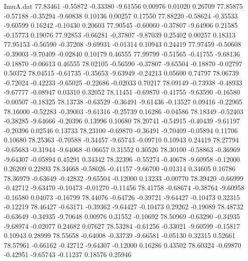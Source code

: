 \begin{filecontents}{ImuA.dat}
  77.83461   -0.55872   -0.33380   -9.61556    0.00976    0.01020    0.26709
  77.85875   -0.57188   -0.35294   -9.60838    0.10136    0.00257    0.17550
  77.88220   -0.58624   -0.35533   -9.60599    0.16242   -0.10430    0.20603
  77.90545   -0.60060   -0.37807   -9.64906    0.21585   -0.15773    0.19076
  77.92853   -0.66281   -0.37807   -9.87039    0.25402    0.00257    0.18313
  77.95153   -0.56590   -0.37208   -9.69931   -0.01314    0.10943    0.24419
  77.97459   -0.50608   -0.39003   -9.70409   -0.02840    0.10179    0.46555
  77.99799   -0.51565   -0.41755   -9.68136   -0.18870   -0.06613    0.46555
  78.02105   -0.56590   -0.37807   -9.65504   -0.18870   -0.02797    0.50372
  78.04515   -0.61735   -0.35653   -9.63949   -0.24213    0.05600    0.74797
  78.06739   -0.72024   -0.42233   -9.65025   -0.22686   -0.02033    0.70217
  78.09149   -0.73938   -0.48933   -9.67777   -0.08947    0.03310    0.32052
  78.11451   -0.69870   -0.41755   -9.63590   -0.16580   -0.00507   -0.18325
  78.13738   -0.63529   -0.36491   -9.61436   -0.13527    0.09416   -0.22905
  78.16000   -0.52283   -0.39003   -9.61316   -0.25739    0.16286   -0.04586
  78.18349   -0.52403   -0.38285   -9.64666   -0.20396    0.13996    0.10680
  78.20741   -0.54915   -0.40439   -9.61197   -0.20396    0.02546    0.13733
  78.23100   -0.69870   -0.36491   -9.70409   -0.05894    0.11706    0.10680
  78.25363   -0.70588   -0.34457   -9.65743   -0.09710    0.10943    0.24419
  78.27794   -0.65683   -0.31944   -9.64068   -0.06657    0.31552    0.30526
  78.30100   -0.58863   -0.36969   -9.64307   -0.05894    0.45291    0.34342
  78.32396   -0.55274   -0.40678   -9.60958   -0.12000    0.26209    0.22893
  78.34668   -0.58026   -0.41157   -9.66700   -0.01314    0.34605    0.16786
  78.36979   -0.63649   -0.42832   -9.65504   -0.12000    0.13233   -0.00770
  78.39420   -0.66999   -0.42712   -9.63470   -0.10473   -0.01270   -0.11456
  78.41758   -0.68674   -0.38764   -9.60958   -0.16580    0.04073   -0.16799
  78.44076   -0.64726   -0.39721   -9.64427   -0.10473    0.32315   -0.12219
  78.46427   -0.63171   -0.39362   -9.64427   -0.10473    0.29262   -0.19089
  78.48732   -0.63649   -0.34935   -9.70648    0.00976    0.31552   -0.10692
  78.50969   -0.63290   -0.34935   -9.68974   -0.02077    0.24682    0.07627
  78.53284   -0.61256   -0.33021   -9.60599   -0.15817    0.10943    0.28999
  78.55658   -0.64008   -0.33739   -9.66581   -0.05130    0.32315    0.52661
  78.57961   -0.66162   -0.42712   -9.64307   -0.12000    0.16286    0.43502
  78.60324   -0.69870   -0.42951   -9.65743   -0.11237    0.18576    0.25946

\end{filecontents}
